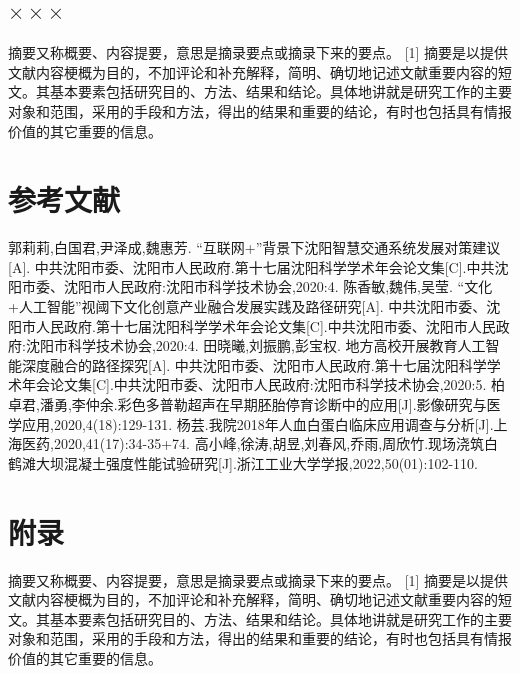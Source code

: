 \documentclass[12pt,oneside,a4paper,fleqn]{ctexart}
\begin{document}
\begin{spacing}{1.25}
\end{spacing}\vspace{0.5em} \subsection{\heiti $\times \times \times $}\begin{spacing}{1.25}

摘要又称概要、内容提要，意思是摘录要点或摘录下来的要点。 [1]  摘要是以提供文献内容梗概为目的，不加评论和补充解释，简明、确切地记述文献重要内容的短文。其基本要素包括研究目的、方法、结果和结论。具体地讲就是研究工作的主要对象和范围，采用的手段和方法，得出的结果和重要的结论，有时也包括具有情报价值的其它重要的信息。

\end{spacing}\vspace{0.5em} \section*{\heiti 参考文献} \vspace{0.5em}\begin{spacing}{1.25}
    \begin{thebibliography}{99}  

        郭莉莉,白国君,尹泽成,魏惠芳. “互联网+”背景下沈阳智慧交通系统发展对策建议[A]. 中共沈阳市委、沈阳市人民政府.第十七届沈阳科学学术年会论文集[C].中共沈阳市委、沈阳市人民政府:沈阳市科学技术协会,2020:4.
        陈香敏,魏伟,吴莹. “文化+人工智能”视阈下文化创意产业融合发展实践及路径研究[A]. 中共沈阳市委、沈阳市人民政府.第十七届沈阳科学学术年会论文集[C].中共沈阳市委、沈阳市人民政府:沈阳市科学技术协会,2020:4.
        田晓曦,刘振鹏,彭宝权. 地方高校开展教育人工智能深度融合的路径探究[A]. 中共沈阳市委、沈阳市人民政府.第十七届沈阳科学学术年会论文集[C].中共沈阳市委、沈阳市人民政府:沈阳市科学技术协会,2020:5.
        柏卓君,潘勇,李仲余.彩色多普勒超声在早期胚胎停育诊断中的应用[J].影像研究与医学应用,2020,4(18):129-131.
        杨芸.我院2018年人血白蛋白临床应用调查与分析[J].上海医药,2020,41(17):34-35+74.
        高小峰,徐涛,胡昱,刘春风,乔雨,周欣竹.现场浇筑白鹤滩大坝混凝土强度性能试验研究[J].浙江工业大学学报,2022,50(01):102-110.
        \end{thebibliography}
\end{spacing}\vspace{0.5em} \section*{\heiti 附录} \vspace{0.5em}\begin{spacing}{1.25}
摘要又称概要、内容提要，意思是摘录要点或摘录下来的要点。 [1]  摘要是以提供文献内容梗概为目的，不加评论和补充解释，简明、确切地记述文献重要内容的短文。其基本要素包括研究目的、方法、结果和结论。具体地讲就是研究工作的主要对象和范围，采用的手段和方法，得出的结果和重要的结论，有时也包括具有情报价值的其它重要的信息。


\end{spacing}
\end{document}
